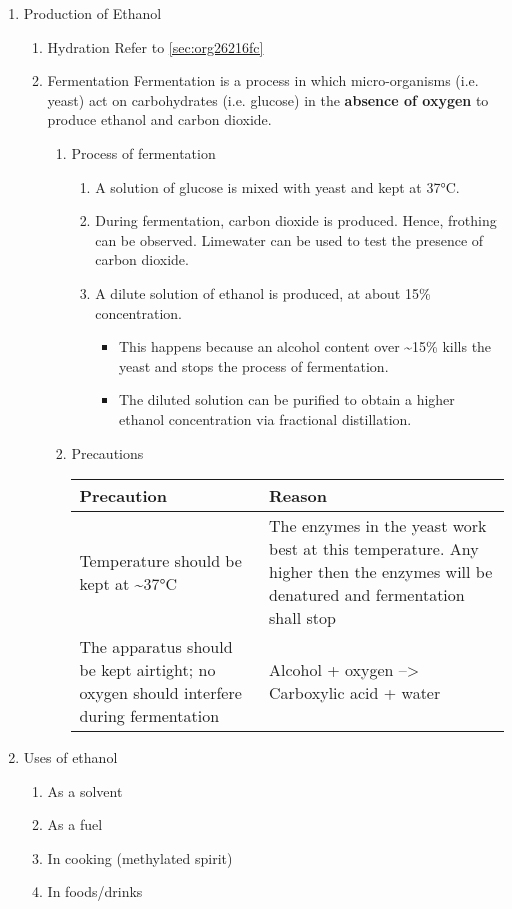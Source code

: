 \documentclass[11pt]{article}
\begin{document}
\begin{enumerate}
\item Production of Ethanol
\label{sec:org6389e1e}
\begin{enumerate}
\item Hydration
\label{sec:org3b26b5c}
Refer to \ref{sec:org26216fc}
\item Fermentation
\label{sec:org5166406}
Fermentation is a process in which micro-organisms (i.e. yeast) act on carbohydrates (i.e. glucose) in the \textbf{absence of oxygen} to produce ethanol and carbon dioxide.
\begin{enumerate}
\item Process of fermentation
\label{sec:orgb94517e}
\begin{enumerate}
\item A solution of glucose is mixed with yeast and kept at 37°C.
\item During fermentation, carbon dioxide is produced. Hence, frothing can be observed. Limewater can be used to test the presence of carbon dioxide.
\item A dilute solution of ethanol is produced, at about 15\% concentration.
\begin{itemize}
\item This happens because an alcohol content over \textasciitilde{}15\% kills the yeast and stops the process of fermentation.
\item The diluted solution can be purified to obtain a higher ethanol concentration via fractional distillation.
\end{itemize}
\end{enumerate}
\item Precautions
\label{sec:orgf8330d3}
\begin{center}
\begin{tabular}{ll}
Precaution & Reason\\
\hline
Temperature should be kept at \textasciitilde{}37°C & The enzymes in the yeast work best at this temperature. Any higher then the enzymes will be denatured and fermentation shall stop\\
The apparatus should be kept airtight; no oxygen should interfere during fermentation & Alcohol + oxygen --> Carboxylic acid + water\\
\end{tabular}
\end{center}
\end{enumerate}
\end{enumerate}
\item Uses of ethanol
\label{sec:org61dcea9}
\begin{enumerate}
\item As a solvent
\item As a fuel
\item In cooking (methylated spirit)
\item In foods/drinks
\end{enumerate}
\end{enumerate}
\end{document}
